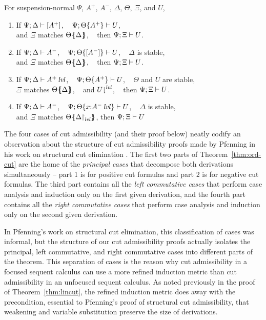 \bigskip
\begin{theorem}\label{thm:ord-cut}
For suspension-normal $\Psi$, $A^+$, $A^-$, $\Delta$, $\Theta$, $\Xi$, and $U$,
\begin{enumerate}
\item If ${\Psi};{\Delta} \vdash {[ A^+ ]} \mathstrut$, ~
         ${\Psi};{{\Theta}\{{A^+}\}} \vdash {U} \mathstrut$,\\
      and $\Xi$ matches ${\Theta}\mbox{$\{\hspace{-4pt}\{$}{{\Delta}}\mbox{$\}\hspace{-4pt}\}$}$, ~
      then ${\Psi};{\Xi} \vdash {U} \mathstrut$.
\item If ${\Psi};{\Delta} \vdash {A^-} \mathstrut$, ~
         ${\Psi};{{\Theta}\{{[A^-]}\}} \vdash {U} \mathstrut$, ~
         $\Delta$ is stable, \\
      and $\Xi$ matches ${\Theta}\mbox{$\{\hspace{-4pt}\{$}{\Delta}\mbox{$\}\hspace{-4pt}\}$}$, ~
      then ${\Psi};{\Xi} \vdash {U} \mathstrut$.
\item If ${\Psi};{\Delta} \vdash {{A^+}\,{{\it lvl}}} \mathstrut$, ~
         ${\Psi};{{\Theta}\{{A^+}\}} \vdash {U} \mathstrut$, ~
         $\Theta$ and $U$ are stable, \\ 
      $\Xi$ matches ${\Theta}\mbox{$\{\hspace{-4pt}\{$}{\Delta}\mbox{$\}\hspace{-4pt}\}$}$, ~
      and ${U}{\downharpoonright}^{{\it lvl}}$, ~
      then ${\Psi};{\Xi} \vdash {U} \mathstrut$.
\item If ${\Psi};{\Delta} \vdash {{A^-}} \mathstrut$, ~
         ${\Psi};{{\Theta}\{{x{:}{A^-}\,{{\it lvl}}}\}} \vdash {U} \mathstrut$, ~
         $\Delta$ is stable, \\ 
      and $\Xi$ matches ${\Theta}\mbox{$\{\hspace{-4pt}\{$}{\ensuremath{{\Delta}{\upharpoonright}_{{\it lvl}}}}\mbox{$\}\hspace{-4pt}\}$}$,
      then ${\Psi};{\Xi} \vdash {U} \mathstrut$
\end{enumerate}
\end{theorem}
\bigskip

\noindent
The four cases of cut admissibility (and their proof below) neatly
codify an observation about the structure of cut admissibility proofs
made by Pfenning in his work on structural cut elimination
\cite{pfenning00structural}.  The first two parts of
Theorem~\ref{thm:ord-cut} are the home of the {\it principal cases}
that decompose both derivations simultaneously -- part 1 is for
positive cut formulas and part 2 is for negative cut formulas. The third
part contains all the {\it left commutative cases} that perform case
analysis and induction only on the first given derivation, and the
fourth part contains all the {\it right commutative cases} that
perform case analysis and induction only on the second given
derivation.

In Pfenning's work on structural cut elimination, this classification
of cases was informal, but the structure of our cut admissibility
proofs actually isolates the principal, left commutative, and right
commutative cases into different parts of the theorem. 
This separation of cases is the reason
why cut admissibility in a focused sequent calculus can use a more
refined induction metric than cut admissibility in an unfocused
sequent calculus. As noted previously in the proof of
Theorem~\ref{thm:lincut}, the refined induction metric does away with
the precondition, essential to Pfenning's proof of 
structural cut admissibility, that
weakening and variable substitution preserve the size of derivations.

